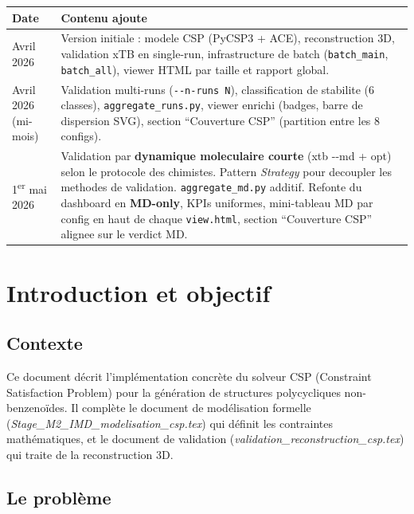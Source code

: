 \documentclass[12pt,a4paper]{article}
\theoremstyle{definition}
\begin{document}
\begin{center}
\begin{tabular}{lp{11cm}}
  \toprule
  Date & Contenu ajoute \\
  \midrule
  Avril 2026 &
    Version initiale : modele CSP (PyCSP3 + ACE), reconstruction 3D, validation
    xTB en single-run, infrastructure de batch (\texttt{batch\_main}, \texttt{batch\_all}),
    viewer HTML par taille et rapport global. \\
  Avril 2026 (mi-mois) &
    Validation multi-runs (\texttt{-{}-n-runs N}), classification de stabilite
    (6 classes), \texttt{aggregate\_runs.py}, viewer enrichi (badges, barre de
    dispersion SVG), section ``Couverture CSP'' (partition entre les 8 configs). \\
  1\textsuperscript{er} mai 2026 &
    Validation par \textbf{dynamique moleculaire courte} (xtb -{}-md + opt) selon le
    protocole des chimistes. Pattern \emph{Strategy} pour decoupler les methodes de
    validation. \texttt{aggregate\_md.py} additif. Refonte du dashboard en
    \textbf{MD-only}, KPIs uniformes, mini-tableau MD par config en haut de chaque
    \texttt{view.html}, section ``Couverture CSP'' alignee sur le verdict MD. \\
  \bottomrule
\end{tabular}
\end{center}

\newpage

\section{Introduction et objectif}

\subsection{Contexte}

Ce document décrit l'implémentation concrète du solveur CSP (Constraint Satisfaction Problem)
pour la génération de structures polycycliques non-benzenoïdes. Il complète le document de
modélisation formelle (\textit{Stage\_M2\_IMD\_modelisation\_csp.tex}) qui définit les contraintes
mathématiques, et le document de validation (\textit{validation\_reconstruction\_csp.tex}) qui
traite de la reconstruction 3D.

\subsection{Le problème}
\end{document}
